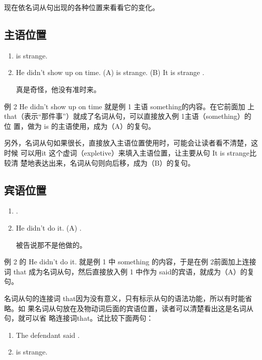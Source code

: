 现在依名词从句出现的各种位置来看看它的变化。

\subsection{主语位置}

\begin{enumerate}
\item {} is strange.
\item He didn't show up on time.
\reitem (A)  is strange.
\reitem (B) It is strange .

真是奇怪，他没有准时来。
\end{enumerate}
例 2 He didn't show up on time 就是例 1 主语 something的内容。在它前面加
上that（表示“那件事”）就成了名词从句，可以直接放入例 1主语（something）的位
置，做为 is 的主语使用，成为（A）的复句。

另外，名词从句如果很长，直接放入主语位置使用时，可能会让读者看不清楚，这时候
可以用it 这个虚词（expletive）来填入主语位置，让主要从句 It is strange比较清
楚地表达出来，名词从句则向后移，成为（B）的复句。

\subsection{宾语位置}

\begin{enumerate}
\item {}  .
\item He didn't do it.
\reitem (A)   .

被告说那不是他做的。
\end{enumerate}

例 2 的 He didn't do it. 就是例 1 中 something 的内容，于是在例 2前面加上连接
词 that 成为名词从句，然后直接放入例 1 中作为 said的宾语，就成为（A）的复句。

名词从句的连接词 that因为没有意义，只有标示从句的语法功能，所以有时能省略。如
果名词从句放在及物动词后面的宾语位置，读者可以清楚看出这是名词从句，就可以省
略连接词that。试比较下面两句：

\begin{enumerate}
\item The defendant said  .
\item {} is strange.
\end{enumerate}

